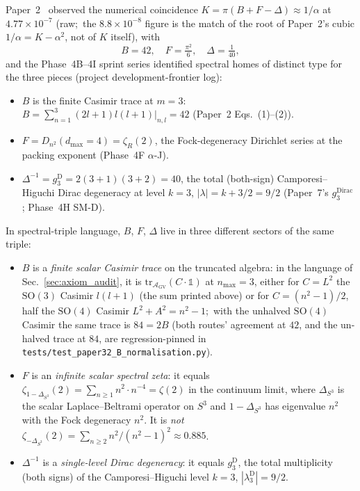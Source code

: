 \documentclass[11pt]{article}
\newcommand{\gvq}[2]{#2}
\begin{document}
Paper~2~\cite{paper2} observed the numerical coincidence
$K = \pi(B + F - \Delta) \approx 1/\alpha$ at $4.77 \times 10^{-7}$ (raw;\ the $8.8 \times 10^{-8}$ figure is the match of the root of Paper~2's cubic $1/\alpha = K - \alpha^2$, not of $K$ itself), with
\[
   B = \gvq{b_casimir}{42}, \quad F = \gvq{f_fock_dirichlet}{\tfrac{\pi^2}{6}}, \quad \Delta = \gvq{delta_dirac}{\tfrac{1}{40}},
\]
and the Phase~4B--4I sprint series identified spectral homes of
distinct type for the three pieces (project development-frontier log):
\begin{itemize}\setlength{\itemsep}{0pt}
\item $B$ is the finite Casimir trace at $m=3$:
$B = \sum_{n=1}^{3} (2l+1)l(l+1)|_{n,l} = 42$ (Paper~2 Eqs.~(1)--(2)).
\item $F = D_{n^2}(d_{\max} = 4) = \zeta_R(2)$, the Fock-degeneracy
Dirichlet series at the packing exponent (Phase~4F $\alpha$-J).
\item $\Delta^{-1} = g_3^{\mathrm{D}} = 2(3+1)(3+2) = 40$, the total
(both-sign) Camporesi--Higuchi Dirac degeneracy at level $k = 3$,
$|\lambda| = k + 3/2 = 9/2$ (Paper~7's $g_3^{\mathrm{Dirac}}$; Phase~4H SM-D).
\end{itemize}

In spectral-triple language, $B$, $F$, $\Delta$ live in three different
sectors of the same triple:

\begin{itemize}\setlength{\itemsep}{2pt}
\item $B$ is a \emph{finite scalar Casimir trace} on the truncated
algebra: in the language of Sec.~\ref{sec:axiom_audit}, it is
$\mathrm{tr}_{\mathcal{A}_{\mathrm{GV}}}(C \cdot \mathbb{1})$ at
$n_{\max} = 3$, either for $C = L^2$ the $\mathrm{SO}(3)$ Casimir
$l(l+1)$ (the sum printed above) or for $C = (n^2 - 1)/2$, half the
$\mathrm{SO}(4)$ Casimir $L^2 + A^2 = n^2 - 1$;\ with the unhalved
$\mathrm{SO}(4)$ Casimir the same trace is $84 = 2B$ (both routes'
agreement at $42$, and the un-halved trace at $84$, are regression-pinned
in \texttt{tests/test\_paper32\_B\_normalisation.py}).
\item $F$ is an \emph{infinite scalar spectral zeta}: it equals
$\zeta_{1-\Delta_{S^3}}(2) = \sum_{n \ge 1} n^2 \cdot n^{-4} = \zeta(2)$
in the continuum limit, where $\Delta_{S^3}$ is the scalar
Laplace--Beltrami operator on $S^3$ and $1 - \Delta_{S^3}$ has
eigenvalue $n^2$ with the Fock degeneracy $n^2$.  It is \emph{not}
$\zeta_{-\Delta_{S^3}}(2) = \sum_{n \ge 2} n^2/(n^2-1)^2 \approx 0.885$.
\item $\Delta^{-1}$ is a \emph{single-level Dirac degeneracy}: it
equals $g_3^{\mathrm{D}}$, the total multiplicity (both signs) of the
Camporesi--Higuchi level $k = 3$, $|\lambda_3^{\mathrm{D}}| = 9/2$.
\end{itemize}
\end{document}
